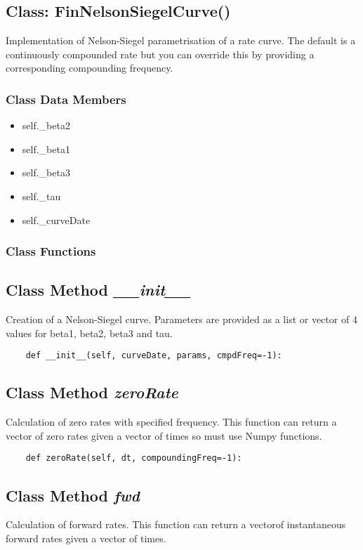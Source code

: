 \documentclass[twoside,11pt]{book}
\begin{document}
\subsection{Class: FinNelsonSiegelCurve()}
Implementation of Nelson-Siegel parametrisation of a rate curve. The default is a continuously compounded rate but you can override this by providing a corresponding compounding frequency. 

\subsubsection{Class Data Members}
\begin{itemize}
\item{self.\_beta2}
\item{self.\_beta1}
\item{self.\_beta3}
\item{self.\_tau}
\item{self.\_curveDate}
\end{itemize}

\subsubsection{Class Functions}

\subsection{Class Method {\it \_\_init\_\_}}
Creation of a Nelson-Siegel curve. Parameters are provided as a list or vector of 4 values for beta1, beta2, beta3 and tau. 

\begin{lstlisting}
    def __init__(self, curveDate, params, cmpdFreq=-1):
\end{lstlisting}

\subsection{Class Method {\it zeroRate}}
Calculation of zero rates with specified frequency. This function can return a vector of zero rates given a vector of times so must use Numpy functions. 

\begin{lstlisting}
    def zeroRate(self, dt, compoundingFreq=-1):
\end{lstlisting}

\subsection{Class Method {\it fwd}}
Calculation of forward rates. This function can return a vectorof instantaneous forward rates given a vector of times. 
\end{document}
